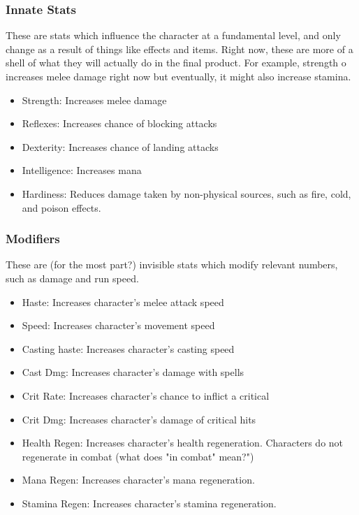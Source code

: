 \documentclass{article}
\begin{document}
\subsubsection{Innate Stats}
These are stats which influence the character at a fundamental level, and only change as a result of things
like effects and items. Right now, these are more of a shell of what they will actually do in the final
product. For example, strength o increases melee damage right now but eventually, it might also increase stamina.
\begin{itemize}
    \item Strength: Increases melee damage
    \item Reflexes: Increases chance of blocking attacks
    \item Dexterity: Increases chance of landing attacks
    \item Intelligence: Increases mana
    \item Hardiness: Reduces damage taken by non-physical sources, such as fire, cold, and poison effects.
\end{itemize}


\subsubsection{Modifiers}
These are (for the most part?) invisible stats which modify relevant numbers, such as damage and run speed.
\begin{itemize}
    \item Haste: Increases character's melee attack speed
    \item Speed: Increases character's movement speed
    \item Casting haste: Increases character's casting speed
    \item Cast Dmg: Increases character's damage with spells
    \item Crit Rate: Increases character's chance to inflict a critical
    \item Crit Dmg: Increases character's damage of critical hits
    \item Health Regen: Increases character's health regeneration. Characters do not regenerate in combat
    (what does "in combat" mean?")
    \item Mana Regen: Increases character's mana regeneration.
    \item Stamina Regen: Increases character's stamina regeneration.
\end{itemize}
\end{document}
